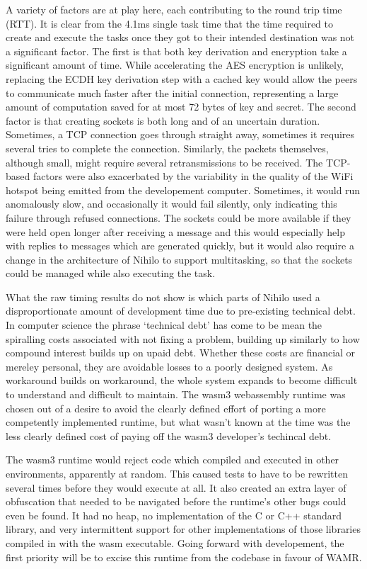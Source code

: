 \documentclass{article}
\begin{document}
A variety of factors are at play here, each contributing to the round trip time (RTT). It is clear from the 4.1ms single task time that the time required to create and execute the tasks once they got to their intended destination was not a significant factor. The first is that both key derivation and encryption take a significant amount of time. While accelerating the AES encryption is unlikely, replacing the ECDH key derivation step with a cached key would allow the peers to communicate much faster after the initial connection, representing a large amount of computation saved for at most 72 bytes of key and secret. The second factor is that creating sockets is both long and of an uncertain duration. Sometimes, a TCP connection goes through straight away, sometimes it requires several tries to complete the connection. Similarly, the packets themselves, although small, might require several retransmissions to be received. The TCP-based factors were also exacerbated by the variability in the quality of the WiFi hotspot being emitted from the developement computer. Sometimes, it would run anomalously slow, and occasionally it would fail silently, only indicating this failure through refused connections. The sockets could be more available if they were held open longer after receiving a message and this would especially help with replies to messages which are generated quickly, but it would also require a change in the architecture of Nihilo to support multitasking, so that the sockets could be managed while also executing the task.

What the raw timing results do not show is which parts of Nihilo used a disproportionate amount of development time due to pre-existing technical debt. In computer science the phrase `technical debt' has come to be mean the spiralling costs associated with not fixing a problem, building up similarly to how compound interest builds up on upaid debt. Whether these costs are financial or mereley personal, they are avoidable losses to a poorly designed system. As workaround builds on workaround, the whole system expands to become difficult to understand and difficult to maintain. The wasm3 webassembly runtime was chosen out of a desire to avoid the clearly defined effort of porting a more competently implemented runtime, but what wasn't known at the time was the less clearly defined cost of paying off the wasm3 developer's techincal debt. 

The wasm3 runtime would reject code which compiled and executed in other environments, apparently at random. This caused tests to have to be rewritten several times before they would execute at all. It also created an extra layer of obfuscation that needed to be navigated before the runtime's other bugs could even be found. It had no heap, no implementation of the C or C++ standard library, and very intermittent support for other implementations of those libraries compiled in with the wasm executable. Going forward with developement, the first priority will be to excise this runtime from the codebase in favour of WAMR.
\end{document}
